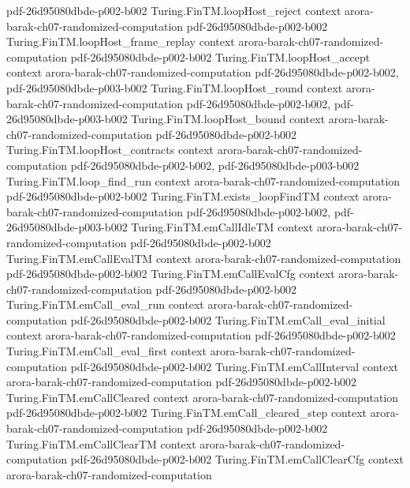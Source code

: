 \begin{theorem}
  {pdf-26d95080dbde-p002-b002}
\proofstep
  {Turing.FinTM.loopHost_reject}
  {context}
  {arora-barak-ch07-randomized-computation}
  {pdf-26d95080dbde-p002-b002}
\proofstep
  {Turing.FinTM.loopHost_frame_replay}
  {context}
  {arora-barak-ch07-randomized-computation}
  {pdf-26d95080dbde-p002-b002}
\proofstep
  {Turing.FinTM.loopHost_accept}
  {context}
  {arora-barak-ch07-randomized-computation}
  {pdf-26d95080dbde-p002-b002,
    pdf-26d95080dbde-p003-b002}
\proofstep
  {Turing.FinTM.loopHost_round}
  {context}
  {arora-barak-ch07-randomized-computation}
  {pdf-26d95080dbde-p002-b002,
    pdf-26d95080dbde-p003-b002}
\proofstep
  {Turing.FinTM.loopHost_bound}
  {context}
  {arora-barak-ch07-randomized-computation}
  {pdf-26d95080dbde-p002-b002}
\proofstep
  {Turing.FinTM.loopHost_contracts}
  {context}
  {arora-barak-ch07-randomized-computation}
  {pdf-26d95080dbde-p002-b002,
    pdf-26d95080dbde-p003-b002}
\proofstep
  {Turing.FinTM.loop_find_run}
  {context}
  {arora-barak-ch07-randomized-computation}
  {pdf-26d95080dbde-p002-b002}
\proofstep
  {Turing.FinTM.exists_loopFindTM}
  {context}
  {arora-barak-ch07-randomized-computation}
  {pdf-26d95080dbde-p002-b002,
    pdf-26d95080dbde-p003-b002}
\proofstep
  {Turing.FinTM.emCallIdleTM}
  {context}
  {arora-barak-ch07-randomized-computation}
  {pdf-26d95080dbde-p002-b002}
\proofstep
  {Turing.FinTM.emCallEvalTM}
  {context}
  {arora-barak-ch07-randomized-computation}
  {pdf-26d95080dbde-p002-b002}
\proofstep
  {Turing.FinTM.emCallEvalCfg}
  {context}
  {arora-barak-ch07-randomized-computation}
  {pdf-26d95080dbde-p002-b002}
\proofstep
  {Turing.FinTM.emCall_eval_run}
  {context}
  {arora-barak-ch07-randomized-computation}
  {pdf-26d95080dbde-p002-b002}
\proofstep
  {Turing.FinTM.emCall_eval_initial}
  {context}
  {arora-barak-ch07-randomized-computation}
  {pdf-26d95080dbde-p002-b002}
\proofstep
  {Turing.FinTM.emCall_eval_first}
  {context}
  {arora-barak-ch07-randomized-computation}
  {pdf-26d95080dbde-p002-b002}
\proofstep
  {Turing.FinTM.emCallInterval}
  {context}
  {arora-barak-ch07-randomized-computation}
  {pdf-26d95080dbde-p002-b002}
\proofstep
  {Turing.FinTM.emCallCleared}
  {context}
  {arora-barak-ch07-randomized-computation}
  {pdf-26d95080dbde-p002-b002}
\proofstep
  {Turing.FinTM.emCall_cleared_step}
  {context}
  {arora-barak-ch07-randomized-computation}
  {pdf-26d95080dbde-p002-b002}
\proofstep
  {Turing.FinTM.emCallClearTM}
  {context}
  {arora-barak-ch07-randomized-computation}
  {pdf-26d95080dbde-p002-b002}
\proofstep
  {Turing.FinTM.emCallClearCfg}
  {context}
  {arora-barak-ch07-randomized-computation}

\end{theorem}
